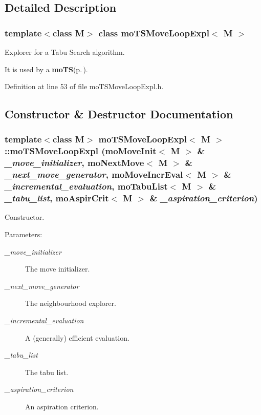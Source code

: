 \subsection{Detailed Description}
\subsubsection*{template$<$class M$>$ class mo\-TSMove\-Loop\-Expl$<$ M $>$}

Explorer for a Tabu Search algorithm. 

It is used by a {\bf mo\-TS}{\rm (p.\,\pageref{classmo_t_s})}. 



Definition at line 53 of file mo\-TSMove\-Loop\-Expl.h.

\subsection{Constructor \& Destructor Documentation}
\subsubsection{\setlength{\rightskip}{0pt plus 5cm}template$<$class M$>$ {\bf mo\-TSMove\-Loop\-Expl}$<$ M $>$::{\bf mo\-TSMove\-Loop\-Expl} ({\bf mo\-Move\-Init}$<$ M $>$ \& {\em \_\-move\_\-initializer}, {\bf mo\-Next\-Move}$<$ M $>$ \& {\em \_\-next\_\-move\_\-generator}, {\bf mo\-Move\-Incr\-Eval}$<$ M $>$ \& {\em \_\-incremental\_\-evaluation}, {\bf mo\-Tabu\-List}$<$ M $>$ \& {\em \_\-tabu\_\-list}, {\bf mo\-Aspir\-Crit}$<$ M $>$ \& {\em \_\-aspiration\_\-criterion})\hspace{0.3cm}{\tt  [inline]}}\label{classmo_t_s_move_loop_expl_a0}


Constructor. 

\begin{Desc}
\item[Parameters:]
\begin{description}
\item[{\em \_\-move\_\-initializer}]The move initializer. \item[{\em \_\-next\_\-move\_\-generator}]The neighbourhood explorer. \item[{\em \_\-incremental\_\-evaluation}]A (generally) efficient evaluation. \item[{\em \_\-tabu\_\-list}]The tabu list. \item[{\em \_\-aspiration\_\-criterion}]An aspiration criterion. \end{description}
\end{Desc}


